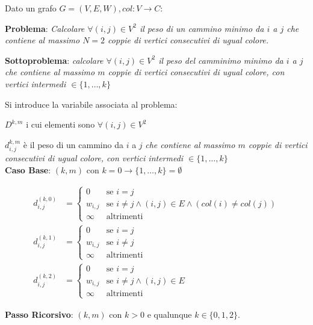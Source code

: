 \begin{example}{}{}
    Dato un grafo $G = (V, E, W), col: V \rightarrow C$:

    \textbf{Problema}: \textit{Calcolare $\forall (i, j) \in V^2$ il peso di un cammino minimo da $i$ a $j$ che contiene al massimo $N = 2$ coppie di vertici consecutivi di ugual colore.}

    \textbf{Sottoproblema}: \textit{calcolare $\forall (i, j) \in V^2$ il peso del camminimo minimo da $i$ a $j$ che contiene al massimo $m$ coppie di vertici consecutivi di ugual colore, con vertici intermedi $\in \{1, \dots, k\}$}

    Si introduce la variabile associata al problema:

    $D^{k,m}$ i cui elementi sono $\forall (i, j) \in V^2$

    $d_{i,j}^{k, m}$ è il peso di un cammino da $i$ a $j$ \textit{che contiene al massimo $m$ coppie di vertici consecutivi di ugual colore, con vertici intermedi $\in \{1, \dots, k\}$} \\

    \textbf{Caso Base}: $(k, m)$ con $k = 0 \rightarrow \{1, \dots, k\} = \emptyset$

    \begin{align*}
    d_{i,j}^{(k, 0)} &= \begin{cases}
        0 & \text{se }i = j \\
        w_{i,j} & \text{se } i \neq j \land (i, j) \in E \land (col(i) \neq col(j)) \\
        \infty & \text{altrimenti}
    \end{cases} \\
    d_{i,j}^{(k, 1)} &= \begin{cases}
        0 & \text{se }i = j \\
        w_{i,j} & \text{se } i \neq j\\
        \infty & \text{altrimenti}
    \end{cases} \\
    d_{i,j}^{(k, 2)} &= \begin{cases}
        0 & \text{se }i = j \\
        w_{i,j} & \text{se } i \neq j \land (i, j) \in E \\
        \infty & \text{altrimenti}
    \end{cases}
    \end{align*}

    \textbf{Passo Ricorsivo}: $(k, m)$ con $k > 0$ e qualunque $k \in \{0, 1, 2\}$.


\end{example}
